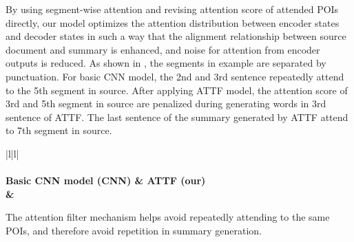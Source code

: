 By using segment-wise attention and revising attention score of attended POIs directly,
our model optimizes the
attention distribution between encoder states and decoder states in such a way that
the alignment relationship between source document and summary is enhanced, 
and noise for attention from encoder outputs is reduced. 
As shown in , the segments in example are separated by punctuation.
For basic CNN model, the 2nd and 3rd sentence repeatedly attend to 
the 5th segment in source.
After applying ATTF model, 
the attention score of 3rd and 5th segment in source are penalized 
during generating words in 3rd sentence of ATTF.
The last sentence of the summary generated by ATTF attend to 7th segment in source.

\begin{table}[th!]
\begin{center}
\scriptsize
\begin{tabular}{|l|l|}%
\hline 
{} \\
\hline
{} \\
\hline 
\bf Basic CNN model (CNN) & \bf ATTF (our) \\
\hline 
{} 
&  \\
\hline
\end{tabular}
\end{center}
\caption{\label{tab:attn_exp} Summary generated by the basic CNN model and ATTF model}
\end{table}
The attention filter mechanism helps avoid repeatedly attending to the same POIs, and therefore avoid repetition in summary generation.


